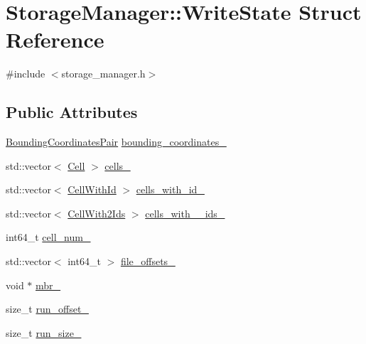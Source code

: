 \hypertarget{structStorageManager_1_1WriteState}{}\section{Storage\+Manager\+:\+:Write\+State Struct Reference}
\label{structStorageManager_1_1WriteState}


{\ttfamily \#include $<$storage\+\_\+manager.\+h$>$}

\subsection*{Public Attributes}
\begin{DoxyCompactItemize}
\item 
\hyperlink{classStorageManager_a2b31e8ccd7a9daa2cf5f9fbf12080667}{Bounding\+Coordinates\+Pair} \hyperlink{structStorageManager_1_1WriteState_a064ab2412c1f90d76c54282d6652335f}{bounding\+\_\+coordinates\+\_\+}
\item 
std\+::vector$<$ \hyperlink{structStorageManager_1_1Cell}{Cell} $>$ \hyperlink{structStorageManager_1_1WriteState_a5a6dfa8165c9591f51d383e4a45b2895}{cells\+\_\+}
\item 
std\+::vector$<$ \hyperlink{structStorageManager_1_1CellWithId}{Cell\+With\+Id} $>$ \hyperlink{structStorageManager_1_1WriteState_a460d73b47fc73edf91fa7babaa1d2543}{cells\+\_\+with\+\_\+id\+\_\+}
\item 
std\+::vector$<$ \hyperlink{structStorageManager_1_1CellWith2Ids}{Cell\+With2\+Ids} $>$ \hyperlink{structStorageManager_1_1WriteState_a7d5e64047d6412bf0f2f851c2f2ec402}{cells\+\_\+with\+\_\+\_\+ids\+\_\+}
\item 
int64\+\_\+t \hyperlink{structStorageManager_1_1WriteState_ad77bd2f8243f610ac81cd53a5bfd0447}{cell\+\_\+num\+\_\+}
\item 
std\+::vector$<$ int64\+\_\+t $>$ \hyperlink{structStorageManager_1_1WriteState_acd9557977b9b964b40981ce1114fcb93}{file\+\_\+offsets\+\_\+}
\item 
void $\ast$ \hyperlink{structStorageManager_1_1WriteState_a2f0d2f44d73d97bcbcdb627562f86dce}{mbr\+\_\+}
\item 
size\+\_\+t \hyperlink{structStorageManager_1_1WriteState_a9fac7bc7b5a38477520185f9918a5fce}{run\+\_\+offset\+\_\+}
\item 
size\+\_\+t \hyperlink{structStorageManager_1_1WriteState_a9403ab762032eb045a6bd890c42c8aa1}{run\+\_\+size\+\_\+}
\item 

\end{DoxyCompactItemize}
